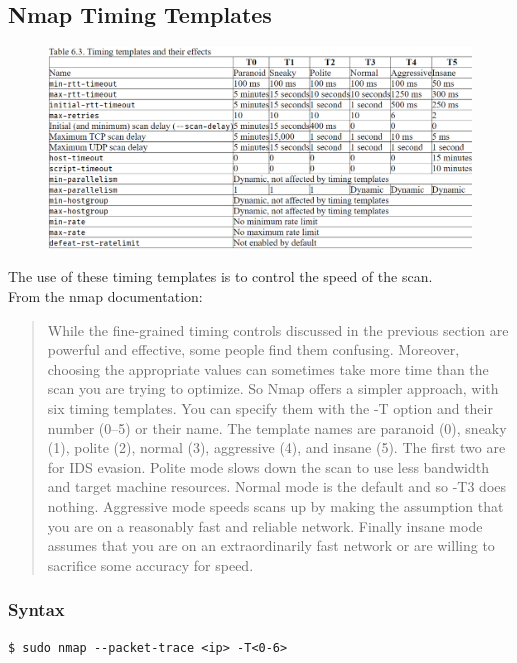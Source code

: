 \documentclass[11pt]{article}
\begin{document}
\subsection{Nmap Timing Templates}

\begin{figure}[H]
    \centering
    \includegraphics[width=.95\textwidth]{timing templates.png}
    \caption{}
\end{figure}

The use of these timing templates is to control the speed of the scan.\\
From the nmap documentation:

\begin{quotation}
    While the fine-grained timing controls discussed in the previous section are powerful and effective, some people find them confusing. Moreover, choosing the appropriate values can sometimes take more time than the scan you are trying to optimize. So Nmap offers a simpler approach, with six timing templates. You can specify them with the -T option and their number (0–5) or their name. The template names are paranoid (0), sneaky (1), polite (2), normal (3), aggressive (4), and insane (5). The first two are for IDS evasion. Polite mode slows down the scan to use less bandwidth and target machine resources. Normal mode is the default and so -T3 does nothing. Aggressive mode speeds scans up by making the assumption that you are on a reasonably fast and reliable network. Finally insane mode assumes that you are on an extraordinarily fast network or are willing to sacrifice some accuracy for speed.
\end{quotation}
    

\subsubsection{Syntax}
\begin{verbatim}
$ sudo nmap --packet-trace <ip> -T<0-6>
\end{verbatim}
\end{document}
